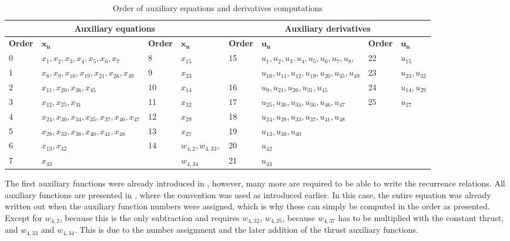 \begin{table}[!ht]
\begin{center}
\caption{Order of auxiliary equations and derivatives computations}
\label{tab:calcOrderAuxEq}
\begin{tabular}{|l|l||l|l||l|l||l|l|}
\hline 
\multicolumn{4}{c}{\textbf{Auxiliary equations}} & \multicolumn{4}{c}{\textbf{Auxiliary derivatives}} \\ \hline \hline
\textbf{Order} & $\mathbf{x_{n}}$ &\textbf{Order} & $\mathbf{x_{n}}$ & \textbf{Order} & $\mathbf{u_{n}}$ & \textbf{Order} & $\mathbf{u_{n}}$ \\ \hline 
0 & $ x_{1}, x_{2}, x_{3}, x_{4}, x_{5}, x_{6}, x_{7} $ & 8 & $ x_{15} $ & 15 & $ u_{1}, u_{2}, u_{3}, u_{4}, u_{5}, u_{6}, u_{7}, u_{8},  $ & 22 & $ u_{15} $ \\ \cline{1-4} \cline{7-8}
1 & $ x_{8}, x_{9}, x_{10}, x_{19}, x_{21}, x_{26}, x_{49} $ & 9 & $ x_{23} $ &  & $ u_{10}, u_{11}, u_{12}, u_{19}, u_{20}, u_{35}, u_{49} $ & 23 & $ u_{23}, u_{32} $ \\ \hline
2 & $ x_{11}, x_{20}, x_{36}, x_{45} $ & 10 & $ x_{14} $ & 16 & $ u_{9}, u_{21}, u_{26}, u_{31}, u_{45} $ & 24 & $ u_{14}, u_{29} $ \\ \hline
3 & $ x_{12}, x_{25}, x_{31} $ & 11 &$ x_{32} $ & 17 & $ u_{25}, u_{30}, u_{34}, u_{36}, u_{46}, u_{47} $ & 25 & $ u_{27} $ \\ \hline
4 & $ x_{24}, x_{30}, x_{34}, x_{35}, x_{37}, x_{46}, x_{47} $ & 12 & $ x_{29} $ & 18 & $ u_{24}, u_{28}, u_{33}, u_{37}, u_{41}, u_{48} $ & & $  $ \\ \hline
5 & $ x_{28}, x_{33}, x_{38}, x_{40}, x_{41}, x_{48} $ & 13 & $ x_{27} $ & 19 & $ u_{13}, u_{38}, u_{40} $ & & $  $ \\ \hline
6 & $ x_{13}, x_{42} $ & 14 & $ w_{4,2}, w_{4,33}, $ & 20 & $ u_{42} $ & & $  $ \\ \cline{1-2} \cline{5-8}
7 & $ x_{43} $ & & $ w_{4,34} $ & 21 & $ u_{43} $ & & $  $ \\ \hline
 
\end{tabular}
\end{center}
\end{table}



The first auxiliary functions were already introduced in , however, many more are required to be able to write the recurrence relations. All auxiliary functions are presented in , where the convention was used as introduced earlier. In this case, the entire equation was already written out when the auxiliary function numbers were assigned, which is why these can simply be computed in the order as presented. Except for $w_{4,2}$, because this is the only subtraction and requires $w_{4,32}$, $w_{4,25}$, because $w_{4,37}$ has to be multiplied with the constant thrust, and $w_{4,33}$ and $w_{4,34}$. This is due to the number assignment and the later addition of the thrust auxiliary functions. 


